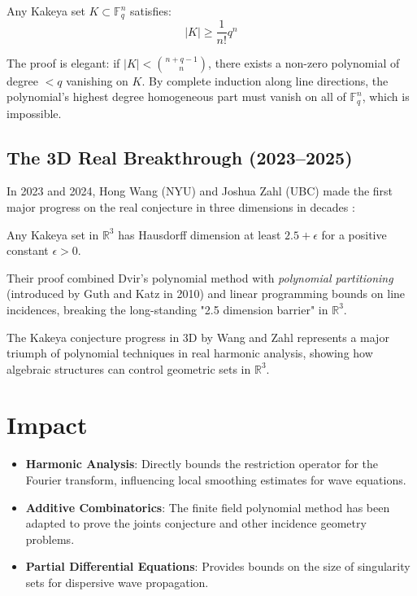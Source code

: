\begin{theorem}
Any Kakeya set $K \subset \mathbb{F}_q^n$ satisfies:
\begin{equation}
|K| \geq \frac{1}{n!} q^n
\end{equation}
\end{theorem}
The proof is elegant: if $|K| < \binom{n+q-1}{n}$, there exists a non-zero polynomial of degree $<q$ vanishing on $K$. By complete induction along line directions, the polynomial's highest degree homogeneous part must vanish on all of $\mathbb{F}_q^n$, which is impossible.

\subsection{The 3D Real Breakthrough (2023--2025)}
In 2023 and 2024, Hong Wang (NYU) and Joshua Zahl (UBC) made the first major progress on the real conjecture in three dimensions in decades \cite{wangzahl2024}:

\begin{theorem}
Any Kakeya set in $\mathbb{R}^3$ has Hausdorff dimension at least $2.5 + \epsilon$ for a positive constant $\epsilon > 0$.
\end{theorem}

Their proof combined Dvir's polynomial method with \emph{polynomial partitioning} (introduced by Guth and Katz in 2010) and linear programming bounds on line incidences, breaking the long-standing "2.5 dimension barrier" in $\mathbb{R}^3$.

\begin{highlightbox}
The Kakeya conjecture progress in 3D by Wang and Zahl represents a major triumph of polynomial techniques in real harmonic analysis, showing how algebraic structures can control geometric sets in $\mathbb{R}^3$.
\end{highlightbox}

\section{Impact}
\begin{itemize}
\item \textbf{Harmonic Analysis}: Directly bounds the restriction operator for the Fourier transform, influencing local smoothing estimates for wave equations.
\item \textbf{Additive Combinatorics}: The finite field polynomial method has been adapted to prove the joints conjecture and other incidence geometry problems.
\item \textbf{Partial Differential Equations}: Provides bounds on the size of singularity sets for dispersive wave propagation.
\end{itemize}

